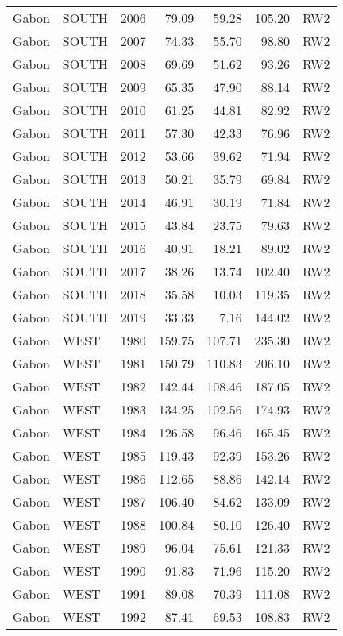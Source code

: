 \begin{longtable}{lllrrrl}
  Gabon & SOUTH & 2006 & 79.09 & 59.28 & 105.20 & RW2 \\ 
  Gabon & SOUTH & 2007 & 74.33 & 55.70 & 98.80 & RW2 \\ 
  Gabon & SOUTH & 2008 & 69.69 & 51.62 & 93.26 & RW2 \\ 
  Gabon & SOUTH & 2009 & 65.35 & 47.90 & 88.14 & RW2 \\ 
  Gabon & SOUTH & 2010 & 61.25 & 44.81 & 82.92 & RW2 \\ 
  Gabon & SOUTH & 2011 & 57.30 & 42.33 & 76.96 & RW2 \\ 
  Gabon & SOUTH & 2012 & 53.66 & 39.62 & 71.94 & RW2 \\ 
  Gabon & SOUTH & 2013 & 50.21 & 35.79 & 69.84 & RW2 \\ 
  Gabon & SOUTH & 2014 & 46.91 & 30.19 & 71.84 & RW2 \\ 
  Gabon & SOUTH & 2015 & 43.84 & 23.75 & 79.63 & RW2 \\ 
  Gabon & SOUTH & 2016 & 40.91 & 18.21 & 89.02 & RW2 \\ 
  Gabon & SOUTH & 2017 & 38.26 & 13.74 & 102.40 & RW2 \\ 
  Gabon & SOUTH & 2018 & 35.58 & 10.03 & 119.35 & RW2 \\ 
  Gabon & SOUTH & 2019 & 33.33 & 7.16 & 144.02 & RW2 \\ 
  Gabon & WEST & 1980 & 159.75 & 107.71 & 235.30 & RW2 \\ 
  Gabon & WEST & 1981 & 150.79 & 110.83 & 206.10 & RW2 \\ 
  Gabon & WEST & 1982 & 142.44 & 108.46 & 187.05 & RW2 \\ 
  Gabon & WEST & 1983 & 134.25 & 102.56 & 174.93 & RW2 \\ 
  Gabon & WEST & 1984 & 126.58 & 96.46 & 165.45 & RW2 \\ 
  Gabon & WEST & 1985 & 119.43 & 92.39 & 153.26 & RW2 \\ 
  Gabon & WEST & 1986 & 112.65 & 88.86 & 142.14 & RW2 \\ 
  Gabon & WEST & 1987 & 106.40 & 84.62 & 133.09 & RW2 \\ 
  Gabon & WEST & 1988 & 100.84 & 80.10 & 126.40 & RW2 \\ 
  Gabon & WEST & 1989 & 96.04 & 75.61 & 121.33 & RW2 \\ 
  Gabon & WEST & 1990 & 91.83 & 71.96 & 115.20 & RW2 \\ 
  Gabon & WEST & 1991 & 89.08 & 70.39 & 111.08 & RW2 \\ 
  Gabon & WEST & 1992 & 87.41 & 69.53 & 108.83 & RW2 \\ 

\end{longtable}
